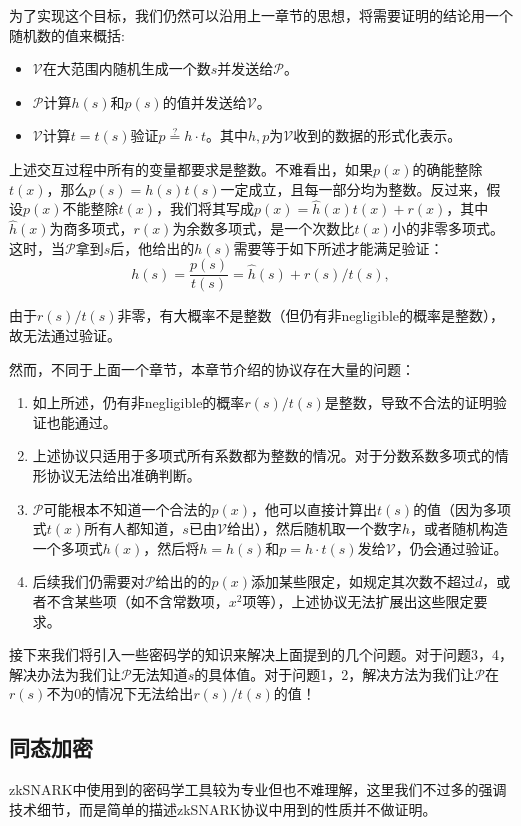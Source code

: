 \documentclass[12pt]{article}
\newcommand{\zk}{zkSNARK}
\newcommand{\pp}{$\mathcal{P}$}
\newcommand{\vv}{$\mathcal{V}$}
\begin{document}
为了实现这个目标，我们仍然可以沿用上一章节的思想，将需要证明的结论用一个随机数的值来概括:
\begin{itemize}
	\item \vv 在大范围内随机生成一个数$s$并发送给\pp。
	\item \pp 计算$h(s)$和$p(s)$的值并发送给\vv。
	\item \vv 计算$t=t(s)$验证$p \overset{?}{=} h\cdot t$。其中$h,p$为\vv 收到的数据的形式化表示。
\end{itemize}
上述交互过程中所有的变量都要求是整数。不难看出，如果$p(x)$的确能整除$t(x)$，那么$p(s)=h(s)t(s)$一定成立，且每一部分均为整数。反过来，假设$p(x)$不能整除$t(x)$，我们将其写成$p(x)=\hat{h}(x)t(x)+r(x)$，其中$\hat{h}(x)$为商多项式，$r(x)$为余数多项式，是一个次数比$t(x)$小的非零多项式。这时，当\pp 拿到$s$后，他给出的$h(s)$需要等于如下所述才能满足验证：
$$h(s)=\frac{p(s)}{t(s)}=\hat{h}(s)+r(s)/t(s),$$

由于$r(s)/t(s)$非零，有大概率不是整数（但仍有非negligible的概率是整数），故无法通过验证。

然而，不同于上面一个章节，本章节介绍的协议存在大量的问题：
\begin{enumerate}
	\item 如上所述，仍有非negligible的概率$r(s)/t(s)$是整数，导致不合法的证明验证也能通过。
	\item 上述协议只适用于多项式所有系数都为整数的情况。对于分数系数多项式的情形协议无法给出准确判断。
	\item \pp 可能根本不知道一个合法的$p(x)$，他可以直接计算出$t(s)$的值（因为多项式$t(x)$所有人都知道，$s$已由\vv 给出），然后随机取一个数字$h$，或者随机构造一个多项式$h(x)$，然后将$h=h(s)$和$p=h\cdot t(s)$发给\vv，仍会通过验证。
	\item 后续我们仍需要对\pp 给出的的$p(x)$添加某些限定，如规定其次数不超过$d$，或者不含某些项（如不含常数项，$x^2$项等），上述协议无法扩展出这些限定要求。
\end{enumerate}
接下来我们将引入一些密码学的知识来解决上面提到的几个问题。对于问题3，4，解决办法为我们让\pp 无法知道$s$的具体值。对于问题1，2，解决方法为我们让\pp 在$r(s)$不为0的情况下无法给出$r(s)/t(s)$的值！

\subsection{同态加密}
\zk 中使用到的密码学工具较为专业但也不难理解，这里我们不过多的强调技术细节，而是简单的描述\zk 协议中用到的性质并不做证明。
\end{document}

